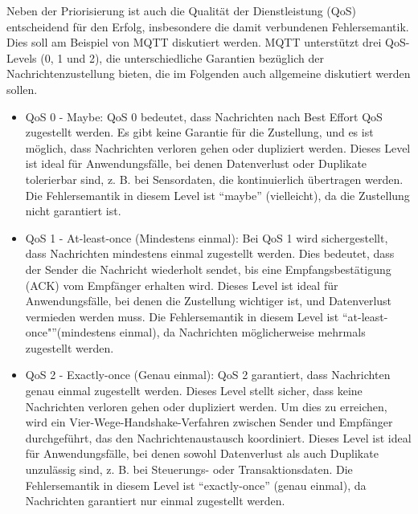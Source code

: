 \documentclass[../vs-script-first-v01.tex]{subfiles}
\begin{document}
Neben der Priorisierung ist auch die Qualität der Dienstleistung (QoS) entscheidend für den Erfolg, insbesondere die damit verbundenen Fehlersemantik. Dies soll am Beispiel von MQTT diskutiert werden.
MQTT unterstützt drei QoS-Levels (0, 1 und 2), die unterschiedliche Garantien bezüglich der Nachrichtenzustellung bieten, die im Folgenden  auch allgemeine diskutiert werden sollen. 
\begin{itemize}
\item QoS 0 - Maybe: QoS 0 bedeutet, dass Nachrichten nach Best Effort QoS zugestellt werden. Es gibt keine Garantie für die Zustellung, und es ist möglich, dass Nachrichten verloren gehen oder dupliziert werden. Dieses Level ist ideal für Anwendungsfälle, bei denen Datenverlust oder Duplikate tolerierbar sind, z. B. bei Sensordaten, die kontinuierlich übertragen werden. Die Fehlersemantik in diesem Level ist \enquote{maybe} (vielleicht), da die Zustellung nicht garantiert ist.
\item QoS 1 - At-least-once (Mindestens einmal):
Bei QoS 1 wird sichergestellt, dass Nachrichten mindestens einmal zugestellt werden. Dies bedeutet, dass der Sender die Nachricht wiederholt sendet, bis eine Empfangsbestätigung (ACK) vom Empfänger erhalten wird. Dieses Level ist ideal für Anwendungsfälle, bei denen die Zustellung wichtiger ist, und Datenverlust vermieden werden muss. Die Fehlersemantik in diesem Level ist \enquote{at-least-once"}(mindestens einmal), da Nachrichten möglicherweise mehrmals zugestellt werden.
\item QoS 2 - Exactly-once (Genau einmal):
QoS 2 garantiert, dass Nachrichten genau einmal zugestellt werden. Dieses Level stellt sicher, dass keine Nachrichten verloren gehen oder dupliziert werden. Um dies zu erreichen, wird ein Vier-Wege-Handshake-Verfahren zwischen Sender und Empfänger durchgeführt, das den Nachrichtenaustausch koordiniert. Dieses Level ist ideal für Anwendungsfälle, bei denen sowohl Datenverlust als auch Duplikate unzulässig sind, z. B. bei Steuerungs- oder Transaktionsdaten. Die Fehlersemantik in diesem Level ist \enquote{exactly-once} (genau einmal), da Nachrichten garantiert nur einmal zugestellt werden.
\end{itemize}
\end{document}
